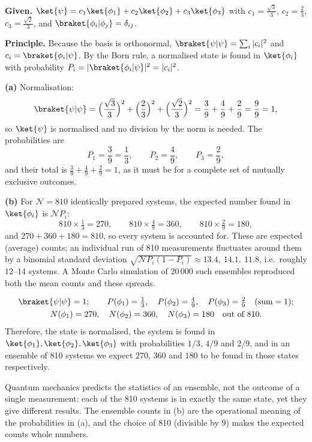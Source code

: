 \begin{solutionbox}
\textbf{Given.} $\ket{\psi}=c_1\ket{\phi_1}+c_2\ket{\phi_2}+c_3\ket{\phi_3}$ with $c_1=\frac{\sqrt3}{3}$, $c_2=\frac23$, $c_3=\frac{\sqrt2}{3}$, and $\braket{\phi_i|\phi_j}=\delta_{ij}$.

\textbf{Principle.} Because the basis is orthonormal, $\braket{\psi|\psi}=\sum_i|c_i|^2$ and $c_i=\braket{\phi_i|\psi}$. By the Born rule, a normalised state is found in $\ket{\phi_i}$ with probability $P_i=|\braket{\phi_i|\psi}|^2=|c_i|^2$.

\textbf{(a)} Normalisation:
\[
\braket{\psi|\psi}=\Big(\frac{\sqrt3}{3}\Big)^2+\Big(\frac23\Big)^2+\Big(\frac{\sqrt2}{3}\Big)^2=\frac39+\frac49+\frac29=\frac99=1,
\]
so $\ket{\psi}$ is normalised and no division by the norm is needed. The probabilities are
\[
P_1=\frac39=\frac13,\qquad P_2=\frac49,\qquad P_3=\frac29,
\]
and their total is $\frac39+\frac49+\frac29=1$, as it must be for a complete set of mutually exclusive outcomes.

\textbf{(b)} For $\mathcal N=810$ identically prepared systems, the expected number found in $\ket{\phi_i}$ is $\mathcal N P_i$:
\[
810\times\tfrac13=270,\qquad 810\times\tfrac49=360,\qquad 810\times\tfrac29=180,
\]
and $270+360+180=810$, so every system is accounted for. These are expected (average) counts; an individual run of 810 measurements fluctuates around them by a binomial standard deviation $\sqrt{\mathcal N P_i(1-P_i)}\approx13.4,\ 14.1,\ 11.8$, i.e.\ roughly $12$--$14$ systems. A Monte Carlo simulation of 20\,000 such ensembles reproduced both the mean counts and these spreads.
\end{solutionbox}

\begin{answerbox}
\begin{gather*}
\braket{\psi|\psi}=1;\qquad P(\phi_1)=\tfrac13,\quad P(\phi_2)=\tfrac49,\quad P(\phi_3)=\tfrac29\quad(\text{sum}=1);\\
N(\phi_1)=270,\quad N(\phi_2)=360,\quad N(\phi_3)=180\quad\text{out of }810.
\end{gather*}
Therefore, the state is normalised, the system is found in $\ket{\phi_1},\ket{\phi_2},\ket{\phi_3}$ with probabilities $1/3$, $4/9$ and $2/9$, and in an ensemble of 810 systems we expect $270$, $360$ and $180$ to be found in those states respectively.
\end{answerbox}

\begin{insightbox}
Quantum mechanics predicts the statistics of an ensemble, not the outcome of a single measurement: each of the 810 systems is in exactly the same state, yet they give different results. The ensemble counts in (b) are the operational meaning of the probabilities in (a), and the choice of 810 (divisible by 9) makes the expected counts whole numbers.
\end{insightbox}
